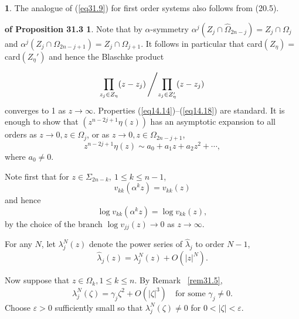 \documentclass{surv-l}
\theoremstyle{plain}
\theoremstyle{definition}
\newtheorem*{pop313}{\sc{Proof} of Proposition 31.3}
\newtheorem{remark}[theorem]{\sc{Remark}}
\numberwithin{equation}{chapter}
\begin{document}
\setcounter{theorem}{11}
\begin{remark}\label{rem31.12}
The analogue of (\ref{eq31.9}) for first order systems also follows from (20.5).
\end{remark}
\begin{pop313}
Note that by $\alpha$-symmetry $\alpha^{j}(Z_{j}\cap\hat{\Omega}_{2n-j})= Z_{j}\cap\Omega_{j}$ and $\alpha^{j}(Z_{j}\cap\Omega_{2n-j+1})=Z_{j}\cap\Omega_{j+1}$. It follows in particular that card$(Z_{\eta})=$ card$(Z_{\eta}')$ and hence the Blaschke product
\end{pop313}
\begin{equation*}
\prod_{z_{j}\in Z_{\eta}}(z-z_{j})\left/\prod_{z_{j}\in Z_{\eta}'}(z-z_{j})\right.
\end{equation*}
converges to 1 as $z \rightarrow\infty$. Properties (\ref{eq14.14})--(\ref{eq14.18}) are standard. It is enough to show that $(z^{n-2j+1}\eta(z))$ has an asymptotic expansion to all orders as $z\rightarrow 0, z\in\Omega_{j}$, or as $z\rightarrow 0, z\in\Omega_{2n-j+1}$,
\setcounter{equation}{12}
\begin{equation}\label{eq31.13}
z^{n-2j+1}\eta(z)\sim a_{0}+a_{1}z+a_{2}z^{2}+\cdots,
\end{equation}
where $a_{0}\neq 0$.

Note first that for $z\in{\Sigma}_{2n-k}, \ 1\leq k\leq n-1$,
\begin{equation}\label{eq31.14}
v_{kk}(\alpha^{k}z)=v_{kk}(z)
\end{equation}
and hence
\begin{equation}\label{eq31.15}
\log v_{kk}(\alpha^{k}z)=\log v_{kk}(z),
\end{equation}
by the choice of the branch $\log v_{jj}(z)\rightarrow 0$ as $ z\rightarrow\infty$.

For any $N$, let $\lambda_{j}^{N}(z)$ denote the power series of $\hat{\lambda}_{j}$ to order $N-1$,
\begin{equation}\label{eq31.16}
\hat{\lambda}_{j}(z)=\lambda_{j}^{N}(z)+O(|z|^{N}).
\end{equation}

Now suppose that $z\in\Omega_{k}, 1\leq k\leq n$. By Remark ~\ref{rem31.5},
\begin{equation}\label{eq31.17}
\lambda_{j}^{N}(\zeta)=\gamma_{j}\zeta^{2}+O(|\zeta|^{3})\quad \text{for some } \gamma_{j}\neq 0.
\end{equation}
Choose $\varepsilon >0$ sufficiently small so that $\lambda_{j}^{N}(\zeta)\neq 0$ for $ 0<|\zeta|<\varepsilon$.
\end{document}
